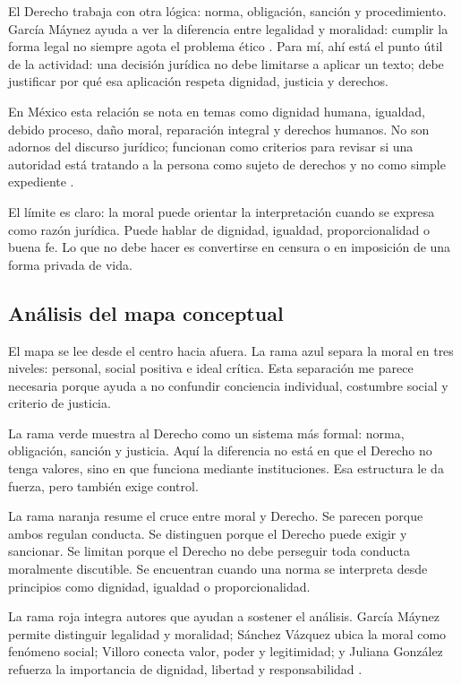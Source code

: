 \documentclass[
	spanish,
	letterpaper, oneside
]{article}
\begin{document}
El Derecho trabaja con otra lógica: norma, obligación, sanción y procedimiento. García Máynez ayuda a ver la diferencia entre legalidad y moralidad: cumplir la forma legal no siempre agota el problema ético \citep{garciaMaynezEtica}. Para mí, ahí está el punto útil de la actividad: una decisión jurídica no debe limitarse a aplicar un texto; debe justificar por qué esa aplicación respeta dignidad, justicia y derechos.

En México esta relación se nota en temas como dignidad humana, igualdad, debido proceso, daño moral, reparación integral y derechos humanos. No son adornos del discurso jurídico; funcionan como criterios para revisar si una autoridad está tratando a la persona como sujeto de derechos y no como simple expediente \citep{cndhMarcoNormativo2026}.

El límite es claro: la moral puede orientar la interpretación cuando se expresa como razón jurídica. Puede hablar de dignidad, igualdad, proporcionalidad o buena fe. Lo que no debe hacer es convertirse en censura o en imposición de una forma privada de vida.

\subsection{Análisis del mapa conceptual}

El mapa se lee desde el centro hacia afuera. La rama azul separa la moral en tres niveles: personal, social positiva e ideal crítica. Esta separación me parece necesaria porque ayuda a no confundir conciencia individual, costumbre social y criterio de justicia.

La rama verde muestra al Derecho como un sistema más formal: norma, obligación, sanción y justicia. Aquí la diferencia no está en que el Derecho no tenga valores, sino en que funciona mediante instituciones. Esa estructura le da fuerza, pero también exige control.

La rama naranja resume el cruce entre moral y Derecho. Se parecen porque ambos regulan conducta. Se distinguen porque el Derecho puede exigir y sancionar. Se limitan porque el Derecho no debe perseguir toda conducta moralmente discutible. Se encuentran cuando una norma se interpreta desde principios como dignidad, igualdad o proporcionalidad.

La rama roja integra autores que ayudan a sostener el análisis. García Máynez permite distinguir legalidad y moralidad; Sánchez Vázquez ubica la moral como fenómeno social; Villoro conecta valor, poder y legitimidad; y Juliana González refuerza la importancia de dignidad, libertad y responsabilidad \citep{garciaMaynezEtica,sanchezVazquezEtica1969,villoroPoderValor1997,gonzalezEthosDestino1996}.
\end{document}

